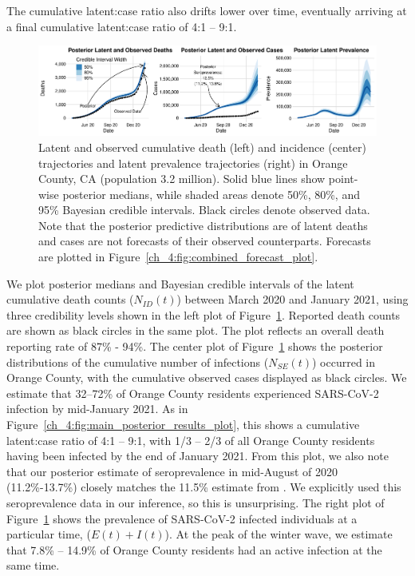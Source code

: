 The cumulative latent:case ratio also drifts lower over time, eventually arriving at a final cumulative latent:case ratio of 4:1 -- 9:1.
\par
\begin{figure}[htbp]
    \centering
    \includegraphics[width=1.0\columnwidth]{dip_plot.pdf}
    \caption{Latent and observed cumulative death (left) and incidence (center) trajectories and latent prevalence trajectories (right) in Orange County, CA (population 3.2 million).
    Solid blue lines show point-wise posterior medians, while shaded areas denote 50\%, 80\%, and 95\% Bayesian credible intervals.
    Black circles denote observed data.
    Note that the posterior predictive distributions are of latent deaths and cases are not forecasts of their observed counterparts.
    Forecasts are plotted in Figure~\ref{ch_4:fig:combined_forecast_plot}.}
    \label{ch_4:fig:dip_plot}
\end{figure}

We plot posterior medians and Bayesian credible intervals of the latent cumulative death counts ($N_{ID}(t)$) between March 2020 and January 2021, using three credibility levels shown in the left plot of Figure~\ref{ch_4:fig:dip_plot}.
Reported death counts are shown as black circles in the same plot.
The plot reflects an overall death reporting rate of 87\% - 94\%.
The center plot of Figure~\ref{ch_4:fig:dip_plot} shows the posterior distributions of the cumulative number of infections ($N_{SE}(t)$) occurred in Orange County, with the cumulative observed cases displayed as black circles.
We estimate that 32--72\% of Orange County residents experienced SARS-CoV-2 infection by mid-January 2021.
As in Figure~\ref{ch_4:fig:main_posterior_results_plot}, this shows a cumulative latent:case ratio of 4:1 -- 9:1, with 1/3 -- 2/3 of all Orange County residents having been infected by the end of January 2021.
From this plot, we also note that our posterior estimate of seroprevalence in mid-August of 2020 (11.2\%-13.7\%) closely matches the 11.5\% estimate from \citep{Bruckner2021}. We explicitly used this seroprevalence data in our inference, so this is unsurprising.
The right plot of Figure~\ref{ch_4:fig:dip_plot} shows the prevalence of SARS-CoV-2 infected individuals at a particular time, ($E(t) + I(t)$).
At the peak of the winter wave, we estimate that 7.8\% -- 14.9\% of Orange County residents had an active infection at the same time.
\par

